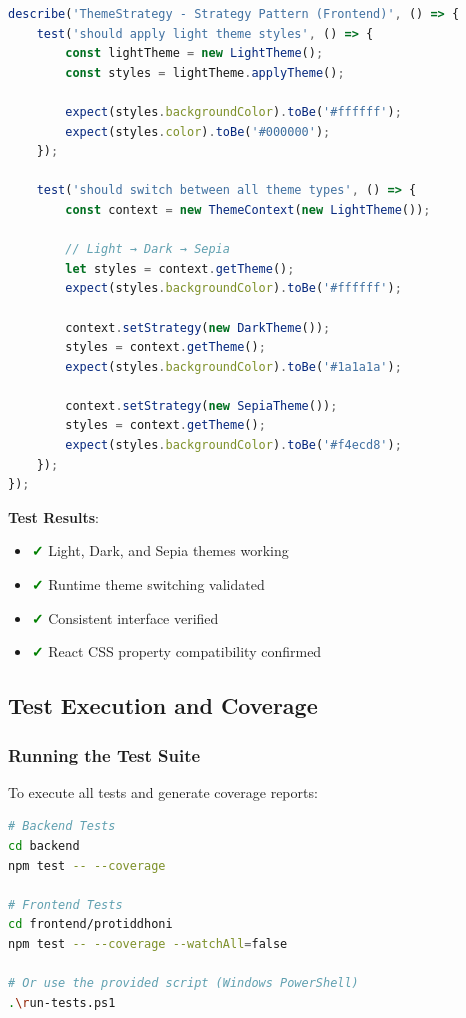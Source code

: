 \begin{lstlisting}[language=TypeScript, caption=Strategy Pattern Test Suite (Frontend)]
describe('ThemeStrategy - Strategy Pattern (Frontend)', () => {
    test('should apply light theme styles', () => {
        const lightTheme = new LightTheme();
        const styles = lightTheme.applyTheme();
        
        expect(styles.backgroundColor).toBe('#ffffff');
        expect(styles.color).toBe('#000000');
    });
    
    test('should switch between all theme types', () => {
        const context = new ThemeContext(new LightTheme());
        
        // Light → Dark → Sepia
        let styles = context.getTheme();
        expect(styles.backgroundColor).toBe('#ffffff');
        
        context.setStrategy(new DarkTheme());
        styles = context.getTheme();
        expect(styles.backgroundColor).toBe('#1a1a1a');
        
        context.setStrategy(new SepiaTheme());
        styles = context.getTheme();
        expect(styles.backgroundColor).toBe('#f4ecd8');
    });
});
\end{lstlisting}

\textbf{Test Results}:
\begin{itemize}
    \item \textcolor{green}{\textbf{✓}} Light, Dark, and Sepia themes working
    \item \textcolor{green}{\textbf{✓}} Runtime theme switching validated
    \item \textcolor{green}{\textbf{✓}} Consistent interface verified
    \item \textcolor{green}{\textbf{✓}} React CSS property compatibility confirmed
\end{itemize}

\subsection{Test Execution and Coverage}

\subsubsection{Running the Test Suite}

To execute all tests and generate coverage reports:

\begin{lstlisting}[language=bash, caption=Test Execution Commands]
# Backend Tests
cd backend
npm test -- --coverage

# Frontend Tests
cd frontend/protiddhoni
npm test -- --coverage --watchAll=false

# Or use the provided script (Windows PowerShell)
.\run-tests.ps1
\end{lstlisting}

